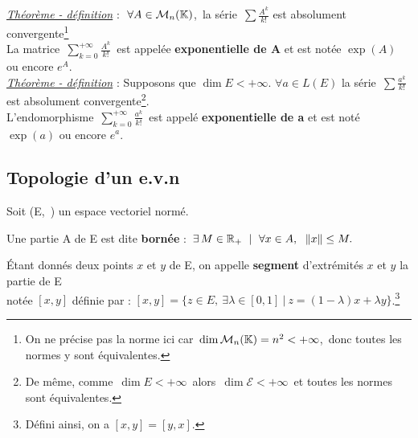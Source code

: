 \newpage

\underline{\emph{Théorème - définition}} : \(\ \forall A\in \mathcal{M}_n(\KK) \),\, la série \(\,\displaystyle \sum \frac{A^k}{k!} \) est absolument convergente\footnote{On ne précise pas la norme ici car \(\,\dim \mathcal{M}_n(\mathbb{K})=n^2<+\infty\),\, donc toutes les normes y sont équivalentes.}\\
La matrice \(\,\displaystyle \sum_{k=0}^{+\infty}\frac{A^k}{k!}\,\) est appelée \textbf{exponentielle de A} et est notée \(\exp (A)\) ou encore \(e^A\).\vspace{0.3cm}\\

\underline{\emph{Théorème - définition}} : Supposons que \(\dim E<+\infty\). \(\forall a\in L(E)\) la série \(\,\displaystyle \sum \frac{a^k}{k!}\,\) est absolument convergente\footnote{De même, comme \(\,\dim E <+\infty\,\) alors \(\,\dim \mathscr{E} < +\infty\,\) et toutes les normes sont équivalentes.}.\\
L'endomorphisme \(\,\displaystyle \sum_{k=0}^{+\infty}\frac{a^k}{k!}\, \) est appelé \textbf{exponentielle de a} et est noté \(\exp(a)\) ou encore \(e^a\).



\vspace{2cm}

\subsection{Topologie d'un e.v.n}

\vspace{0.5cm}
\begin{center}
    Soit (E,\ \normtxt{\ }) un espace vectoriel normé.
\end{center}

\vspace{0.5cm}

Une partie A de E est dite \textbf{bornée} \ssi : \(\, \exists\,M\in \mathbb{R}_+ \ \mid \ \forall x\in A,\ \; \left\lVert x\right\rVert\leq M.\)

\vspace{1cm}

Étant donnés deux points $x$ et $y$ de E, on appelle \textbf{segment} d'extrémités $x$ et $y$ la partie de E\vspace{0.1cm}\\
notée \([x,y]\) définie par :
\([x,y]=\bigl\{z\in E,\ \exists \lambda \in [0,1] \ | \ z=(1-\lambda )x + \lambda y \bigr\} \).\footnote{Défini ainsi, on a \([x,y] = [y,x]\).}

